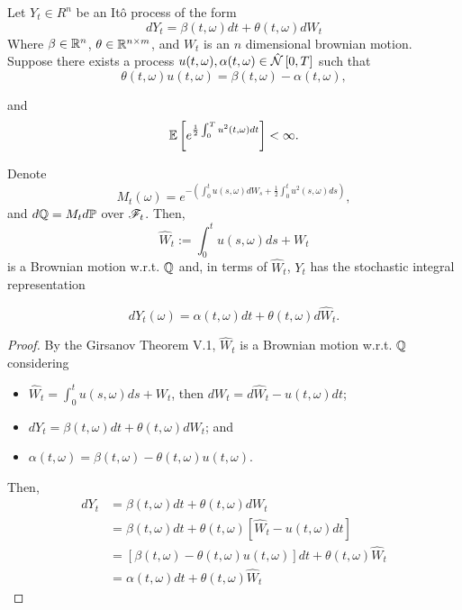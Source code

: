\documentclass[../TGMAFFIRO.tex]{subfiles}
\begin{document}
\begin{theorem}
	Let $Y_t \in R^n$ be an It\^o process of the form
	\begin{equation}
		dY_t = \beta(t,\omega) dt + \theta(t,\omega) dW_t
	\end{equation}
Where $\beta \in \mathbb{R}^{n}$, $\theta \in \mathbb{R}^{n\times m}$, and $W_t$ is an $n$ dimensional brownian motion.\\

Suppose there exists a process $u(t,\omega), \alpha(t, \omega) \in \hat{\mathcal{N}}\left[0, T\right]$ such that
\[
	\theta(t,\omega) u(t,\omega) = \beta(t, \omega) - \alpha(t, \omega),
\]

and 
\[
	\mathbb{E}\left[e^{\frac{1}{2}\int_0^T u^2(t,\omega) dt}\right] < \infty.
\]

Denote
\begin{equation}
	M_t(\omega) = e^{-\left(\int_0^t u(s,\omega) dW_s + \frac{1}{2}\int_0^t u^2(s, \omega) ds\right)},
\end{equation}
and $d\mathbb{Q} = M_t d\mathbb{P}$ over $\mathscr{F}_t$. Then,
\begin{equation}
  \hat W_t := \int_0^t u(s,\omega) ds + W_t
\end{equation}
is a Brownian motion w.r.t. $\mathbb{Q}$ and, in terms of $\hat W_t$, $Y_t$ has the stochastic integral representation

\begin{equation}
	dY_t(\omega) = \alpha(t,\omega) dt + \theta(t, \omega) d\hat W_t.	
\end{equation}
\end{theorem}

\begin{proof}
	By the Girsanov Theorem V.1, $\hat W_t$ is a Brownian motion w.r.t. $\mathbb{Q}$ considering
	\begin{itemize}
		\item $\hat W_t = \int_0^t u(s,\omega) ds + W_t$, then $dW_t = d\hat W_t - u(t,\omega) dt$;
		\item $dY_t = \beta(t,\omega) dt + \theta(t,\omega) dW_t$; and
		\item $\alpha(t,\omega) = \beta(t,\omega) - \theta(t,\omega) u(t,\omega)$.
	\end{itemize}	
Then,
\begin{align}
	dY_t &= \beta(t,\omega) dt + \theta(t,\omega) dW_t\nonumber\\
	&= \beta(t,\omega) dt + \theta(t,\omega)[\hat W_t - u(t,\omega) dt]\nonumber\\
	&= [\beta(t,\omega) - \theta(t,\omega)u(t,\omega)]dt + \theta(t,\omega)\hat W_t\nonumber\\
	&= \alpha(t,\omega) dt + \theta(t,\omega)\hat W_t
\end{align}
\end{proof}
\end{document}
